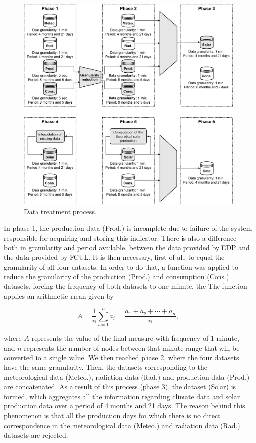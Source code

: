 \begin{figure}[h!]
    \centering
    \begin{center}
    \includegraphics[width=1\textwidth]{Images/Data.png}
    \caption{Data treatment process.}
    \label{datatreatment}
    \end{center}
\end{figure}

In phase 1, the production data (Prod.) is incomplete due to failure of the system responsible for acquiring and storing this indicator. There is also a difference both in granularity and period available, between the data provided by \ac{EDP} and the data provided by \ac{FCUL}. It is then necessary, first of all, to equal the granularity of all four datasets. In order to do that, a function was applied to reduce the granularity of the production (Prod.) and consumption (Cons.) datasets, forcing the frequency of both datasets to one minute. the  The function applies an arithmetic mean given by 

\begin{equation}
     A={\frac {1}{n}}\sum _{i=1}^{n}a_{i}={\frac {a_{1}+a_{2}+\cdots +a_{n}}{n}},
\label{amean}
\end{equation}

where $A$ represents the value of the final measure with frequency of 1 minute, and $n$ represents the number of nodes between that minute range that will be converted to a single value. We then reached phase 2, where the four datasets have the same granularity. Then, the datasets corresponding to the meteorological data (Meteo.), radiation data (Rad.) and production data (Prod.) are concatenated. As a result of this process (phase 3), the dataset (Solar) is formed, which aggregates all the information regarding climate data and solar production data over a period of 4 months and 21 days. The reason behind this phenomenon is that all the production days for which there is no direct correspondence in the meteorological data (Meteo.) and radiation data (Rad.) datasets are rejected. 

